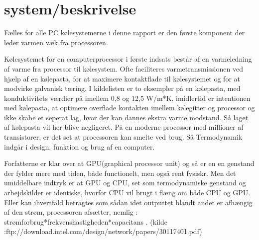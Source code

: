 \section{system/beskrivelse}

Fælles for alle PC kølesystemerne i denne rapport er den første komponent der leder varmen væk fra processoren.

Kølesystemet for en computerprocessor i første indsats består af en varmeledning af varme fra processor til kølesystem.
Ofte faciliteres varmetransmissionen ved hjælp af en kølepasta, for at maximere kontaktflade til kølesystemet og for at modvirke galvanisk tæring.
I kildelisten er to eksempler på en kølepasta, med konduktivitets værdier på imellem 0,8 og 12,5 W/m*K.
imidlertid er intentionen med kølepasta, at optimere overflade kontakten imellem kølegitter og processor og ikke skabe et seperat lag, hvor der kan dannes ekstra varme modstand. Så laget af kølepasta vil her blive negligeret. På en moderne processor med millioner af transistorer, er det set at processoren kan smelte ved brug. Så Termodynamik indgår i design, funktion og brug af en computer.

Forfatterne er klar over at GPU(graphical processor unit) og så er en en genstand der fylder mere med tiden, både functionelt, men også rent fysiskr.  
Men det umiddelbare indtryk er at GPU og CPU, set som termodynamiske genstand og arbejdskilder er identiske, hvorfor CPU vil brugt i flæng om både CPU og GPU.
Eller kan ihvertfald betragtes som sådan idet outputtet blandt andet er afhængig af den strøm, processoren afsætter, nemlig :
 strømforbrug*frekvenshastigheden*capacitans .
 (kilde :ftp://download.intel.com/design/network/papers/30117401.pdf)

